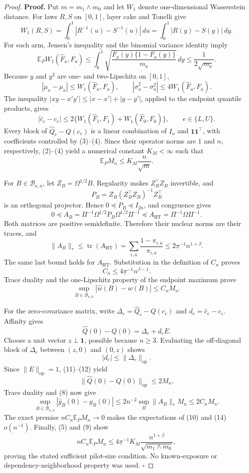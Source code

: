 \documentclass{article}
\begin{document}
\begin{proof}
\textbf{Proof.}
Put \(m=m_1\wedge m_0\) and let \(W_1\) denote one-dimensional Wasserstein distance.  For laws \(R,S\) on \([0,1]\), layer cake and Tonelli give
\[
W_1(R,S)=\int_0^1|R^{-1}(u)-S^{-1}(u)|\,du
=\int_0^1|R(y)-S(y)|\,dy.
\tag{1}
\]
For each arm, Jensen's inequality and the binomial variance identity imply
\[
\mathbb E_PW_1(\widehat F_a,F_a)
\le\int_0^1\sqrt{\frac{F_a(y)\{1-F_a(y)\}}{m_a}}\,dy
\le\frac1{2\sqrt{m_a}}.
\tag{2}
\]
Because \(y\) and \(y^2\) are one- and two-Lipschitz on \([0,1]\),
\[
|\widehat\mu_a-\mu_a|\le W_1(\widehat F_a,F_a),
\qquad
|\widehat\sigma_a^2-\sigma_a^2|\le4W_1(\widehat F_a,F_a).
\tag{3}
\]
The inequality \(|xy-x'y'|\le|x-x'|+|y-y'|\), applied to the endpoint quantile products, gives
\[
|\widehat c_e-c_e|
\le2\{W_1(\widehat F_1,F_1)+W_1(\widehat F_0,F_0)\},
\qquad e\in\{L,U\}.
\tag{4}
\]
Every block of \(\widehat Q_e-Q(c_e)\) is a linear combination of \(I_n\) and \(\mathbf1\mathbf1^{\top}\), with coefficients controlled by (3)--(4).  Since their operator norms are \(1\) and \(n\), respectively, (2)--(4) yield a numerical constant \(K_M<\infty\) such that
\[
\mathbb E_PM_n\le K_M\frac n{\sqrt m}.
\tag{5}
\]

For \(B\in\mathcal B_{\kappa,\overline a}\), let \(Z_B=\Omega^{1/2}B\).  Regularity makes \(Z_B^{\top}Z_B\) invertible, and
\[
P_B=Z_B(Z_B^{\top}Z_B)^{-1}Z_B^{\top}
\tag{6}
\]
is an orthogonal projector.  Hence \(0\preceq P_B\preceq I_{2n}\), and congruence gives
\[
0\preceq A_B
=\Pi^{-1}\Omega^{1/2}P_B\Omega^{1/2}\Pi^{-1}
\preceq A_{\mathrm{HT}}=\Pi^{-1}\Omega\Pi^{-1}.
\tag{7}
\]
Both matrices are positive semidefinite.  Therefore their nuclear norms are their traces, and
\[
\lVert A_B\rVert_*
\le\operatorname{tr}(A_{\mathrm{HT}})
=\sum_{i,a}\frac{1-\pi_{i,a}}{\pi_{i,a}}
\le2\underline\pi^{-1}n^{1+\beta}.
\tag{8}
\]
The same last bound holds for \(A_{\mathrm{HT}}\).  Substitution in the definition of \(C_n\) proves
\[
C_n\le4\underline\pi^{-1}n^{\beta-1}.
\tag{9}
\]
Trace duality and the one-Lipschitz property of the endpoint maximum prove
\[
\sup_{B\in\mathcal B_{\kappa,\overline a}}|\widehat w(B)-w(B)|\le C_nM_n.
\tag{10}
\]

For the zero-covariance matrix, write \(\Delta_e=\widehat Q_e-Q(c_e)\) and \(d_e=\widehat c_e-c_e\).  Affinity gives
\[
\widehat Q(0)-Q(0)=\Delta_e+d_eE.
\tag{11}
\]
Choose a unit vector \(z\perp\mathbf1\), possible because \(n\ge3\).  Evaluating the off-diagonal block of \(\Delta_e\) between \((z,0)\) and \((0,z)\) shows
\[
|d_e|\le\lVert\Delta_e\rVert_{\mathrm{op}}.
\tag{12}
\]
Since \(\lVert E\rVert_{\mathrm{op}}=1\), (11)--(12) yield
\[
\lVert\widehat Q(0)-Q(0)\rVert_{\mathrm{op}}\le2M_n.
\tag{13}
\]
Trace duality and (8) now give
\[
\sup_{B\in\mathcal B_{\kappa,\overline a}}|\widehat g_B(0)-g_B(0)|
\le2n^{-2}\sup_B\lVert A_B\rVert_*M_n
\le2C_nM_n.
\tag{14}
\]
The exact premise \(nC_n\mathbb E_PM_n\to0\) makes the expectations of (10) and (14) \(o(n^{-1})\).  Finally, (5) and (9) show
\[
nC_n\mathbb E_PM_n
\le4\underline\pi^{-1}K_M\frac{n^{1+\beta}}{\sqrt{m_1\wedge m_0}},
\]
proving the stated sufficient pilot-size condition.  No known-exposure or dependency-neighborhood property was used. \(\square\)
\end{proof}
\end{document}
